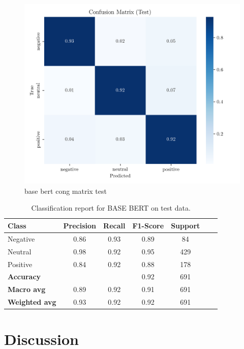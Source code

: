 \documentclass[conference]{IEEEtran}
\begin{document}
\begin{figure}[H]
    \centering
    \includegraphics[width=1\linewidth]{assets/base_bert_confusion_matrix_Test.png}
    \caption{base bert cong matrix test}
    \label{fig:base_bert_confusion_matrix_Test}
\end{figure}

\begin{table}[H]
\centering
\caption{Classification report for BASE BERT on test data.}
\label{cr_basebert_test}
\begin{tabular}{lcccccc}
\toprule
\textbf{Class} & \textbf{Precision} & \textbf{Recall} & \textbf{F1-Score} & \textbf{Support} \\
\midrule
Negative & 0.86 & 0.93 & 0.89 & 84 \\
Neutral & 0.98 & 0.92 & 0.95 & 429 \\
Positive & 0.84 & 0.92 & 0.88 & 178 \\
\midrule
\textbf{Accuracy} &  &  & 0.92 & 691 \\
\textbf{Macro avg} & 0.89 & 0.92 & 0.91 & 691 \\
\textbf{Weighted avg} & 0.93 & 0.92 & 0.92 & 691 \\
\bottomrule
\end{tabular}
\end{table}


\section{Discussion}
\end{document}
